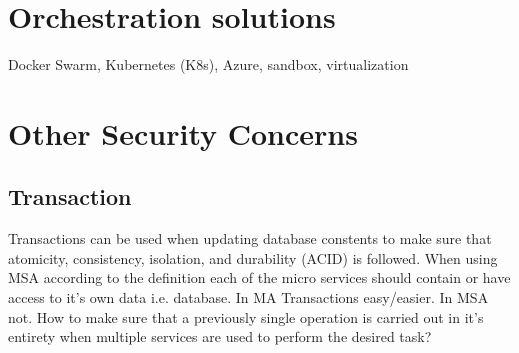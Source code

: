 \section{Orchestration solutions}
\begin{sloppypar}
    Docker Swarm, Kubernetes (K8s), Azure, sandbox, virtualization 
\end{sloppypar}

\section{Other Security Concerns}
\subsection{Transaction}
\begin{sloppypar}
    Transactions can be used when updating database constents to make sure that
    atomicity, consistency, isolation, and durability (ACID) \citep{acid} is 
    followed. When using MSA according to the definition each of the micro 
    services should contain or have access to it's own data i.e. database. 
    In MA Transactions easy/easier. In MSA not. How to make sure that a 
    previously single operation is carried out in it's entirety when multiple 
    services are used to perform the desired task?
\end{sloppypar}

